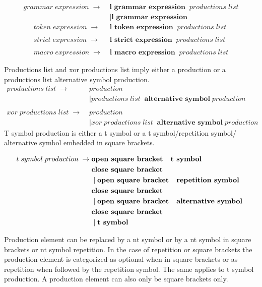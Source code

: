 \begin{align*}
	grammar\;expression\; \rightarrow\; &\textbf{l grammar expression}\;\;productions\;list \\ 
               &\mid \textbf{l grammar expression} 
\end{align*}
\begin{align*}        
	token\;expression\; \rightarrow\; &\textbf{l token expression} \;\;productions\;list \\ \\
	strict\;expression\; \rightarrow\; &\textbf{l strict expression} \;\;productions\;list \\ \\
	macro\;expression\; \rightarrow\; &\textbf{l macro expression} \;\;productions\;list 
\end{align*}

Productions list and xor productions list imply either a production or a productions list alternative symbol production.
\begin{align*}
        productions\;list\; \rightarrow\; &production \\
               &\mid productions\;list\;\;\textbf{alternative symbol} \;production \\ \\                  
        xor\;productions\;list\; \rightarrow\; &production \\
               &\mid xor\;productions\;list\;\;\textbf{alternative symbol}\;production
\end{align*}
T symbol production is either a t symbol or a t symbol/repetition symbol/ alternative symbol embedded in square brackets.

\begin{align*}
	t\;symbol\;production\; \rightarrow\; & \textbf{open square bracket \; t symbol} \\ &\textbf{close square bracket}\\
               &\mid \textbf{open square bracket \; repetition symbol} \\ &\textbf{close square bracket}\\
               &\mid \textbf{open square bracket \; alternative symbol } \\ &\textbf{close square bracket}\\
               &\mid \textbf{t symbol} 
\end{align*}

Production element can be replaced by a nt symbol or by a nt symbol in square brackets or nt symbol repetition. In the case of repetition or square brackets the production element is categorized as optional when in square brackets or as repetition when followed by the repetition symbol. The same applies to t symbol production. A production element can also only be square brackets only.


